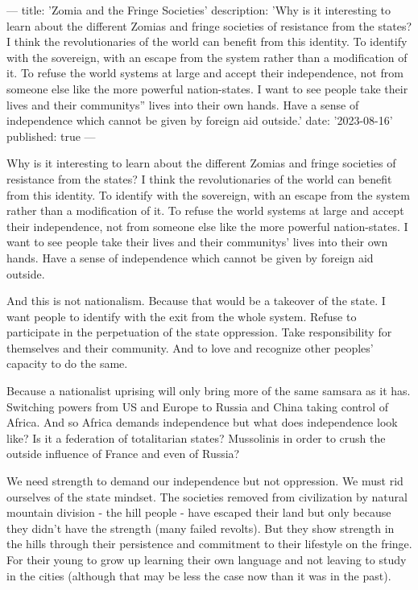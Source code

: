 ---
title: 'Zomia and the Fringe Societies'
description: 'Why is it interesting to learn about the different Zomias and fringe societies of resistance from the states? I think the revolutionaries of the world can benefit from this identity. To identify with the sovereign, with an escape from the system rather than a modification of it. To refuse the world systems at large and accept their independence, not from someone else like the more powerful nation-states. I want to see people take their lives and their communitys'' lives into their own hands. Have a sense of independence which cannot be given by foreign aid outside.'
date: '2023-08-16'
published: true
---

Why is it interesting to learn about the different Zomias and fringe societies of resistance from the states? I think the revolutionaries of the world can benefit from this identity. To identify with the sovereign, with an escape from the system rather than a modification of it. To refuse the world systems at large and accept their independence, not from someone else like the more powerful nation-states. I want to see people take their lives and their communitys' lives into their own hands. Have a sense of independence which cannot be given by foreign aid outside.

And this is not nationalism. Because that would be a takeover of the state. I want people to identify with the exit from the whole system. Refuse to participate in the perpetuation of the state oppression. Take responsibility for themselves and their community. And to love and recognize other peoples' capacity to do the same.

Because a nationalist uprising will only bring more of the same samsara as it has. Switching powers from US and Europe to Russia and China taking control of Africa. And so Africa demands independence but what does independence look like? Is it a federation of totalitarian states? Mussolinis in order to crush the outside influence of France and even of Russia?

We need strength to demand our independence but not oppression. We must rid ourselves of the state mindset. The societies removed from civilization by natural mountain division - the hill people - have escaped their land but only because they didn't have the strength (many failed revolts). But they show strength in the hills through their persistence and commitment to their lifestyle on the fringe. For their young to grow up learning their own language and not leaving to study in the cities (although that may be less the case now than it was in the past).

